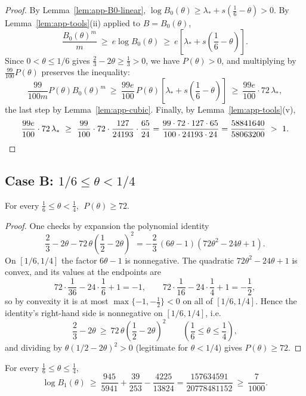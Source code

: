 \begin{proof}
By Lemma~\ref{lem:app-B0-linear},
$\log B_0(\theta)\ge\lambda_*+s(\frac16-\theta)>0$.  By
Lemma~\ref{lem:app-tools}(ii) applied to $B=B_0(\theta)$,
\[
        \frac{B_0(\theta)^m}{m}\ \ge\ e\log B_0(\theta)
        \ \ge\ e\left[\lambda_*+s\left(\frac16-\theta\right)\right].
\]
Since $0<\theta\le1/6$ gives $\frac23-2\theta\ge\frac13>0$, we have
$P(\theta)>0$, and multiplying by $\frac{99}{100}P(\theta)$ preserves the
inequality:
\[
        \frac{99}{100m}P(\theta)B_0(\theta)^m
        \ \ge\ \frac{99e}{100}\,P(\theta)
        \left[\lambda_*+s\left(\frac16-\theta\right)\right]
        \ \ge\ \frac{99e}{100}\cdot72\,\lambda_*,
\]
the last step by Lemma~\ref{lem:app-cubic}.  Finally, by
Lemma~\ref{lem:app-tools}(v),
\[
        \frac{99e}{100}\cdot72\,\lambda_*
        \ \ge\ \frac{99}{100}\cdot72\cdot\frac{127}{24193}\cdot\frac{65}{24}
        =\frac{99\cdot72\cdot127\cdot65}{100\cdot24193\cdot24}
        =\frac{58841640}{58063200}\ >\ 1 . \qedhere
\]
\end{proof}

\subsection*{Case B: $1/6\le\theta<1/4$}

\begin{lemma}\label{lem:app-P72}
For every $\frac16\le\theta<\frac14$, $\;P(\theta)\ge72$.
\end{lemma}

\begin{proof}
One checks by expansion the polynomial identity
\[
        \frac23-2\theta-72\,\theta\left(\frac12-2\theta\right)^2
        =-\frac23\,(6\theta-1)(72\theta^2-24\theta+1).
\]
On $[1/6,1/4]$ the factor $6\theta-1$ is nonnegative.  The quadratic
$72\theta^2-24\theta+1$ is convex, and its values at the endpoints are
\[
        72\cdot\frac1{36}-24\cdot\frac16+1=-1,
        \qquad
        72\cdot\frac1{16}-24\cdot\frac14+1=-\frac12,
\]
so by convexity it is at most $\max\{-1,-\frac12\}<0$ on all of $[1/6,1/4]$.
Hence the identity's right-hand side is nonnegative on $[1/6,1/4]$, i.e.
\[
        \frac23-2\theta\ \ge\ 72\,\theta\left(\frac12-2\theta\right)^2
        \qquad\left(\frac16\le\theta\le\frac14\right),
\]
and dividing by $\theta(1/2-2\theta)^2>0$ (legitimate for $\theta<1/4$)
gives $P(\theta)\ge72$.
\end{proof}

\begin{lemma}\label{lem:app-B1-quad}
For every $\frac16\le\theta\le\frac14$,
\[
        \log B_1(\theta)\ \ge\
        \frac{945}{5941}+\frac{39}{253}-\frac{4225}{13824}
        =\frac{157634591}{20778481152}
        \ \ge\ \frac{7}{1000}.
\]
\end{lemma}

